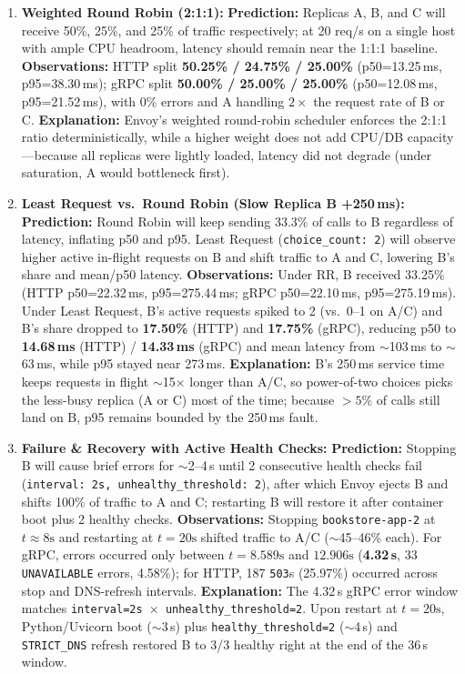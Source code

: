 \documentclass[10pt,a4paper]{article}
\begin{document}
\begin{enumerate}
    \item \textbf{Weighted Round Robin (2:1:1):}
    \textbf{Prediction:} Replicas A, B, and C will receive 50\%, 25\%, and 25\% of traffic respectively; at 20 req/s on a single host with ample CPU headroom, latency should remain near the 1:1:1 baseline.
    \textbf{Observations:} HTTP split \textbf{50.25\% / 24.75\% / 25.00\%} (p50=13.25\,ms, p95=38.30\,ms); gRPC split \textbf{50.00\% / 25.00\% / 25.00\%} (p50=12.08\,ms, p95=21.52\,ms), with 0\% errors and A handling $2\times$ the request rate of B or C.
    \textbf{Explanation:} Envoy's weighted round-robin scheduler enforces the 2:1:1 ratio deterministically, while a higher weight does not add CPU/DB capacity---because all replicas were lightly loaded, latency did not degrade (under saturation, A would bottleneck first).

    \item \textbf{Least Request vs.\ Round Robin (Slow Replica B +250\,ms):}
    \textbf{Prediction:} Round Robin will keep sending 33.3\% of calls to B regardless of latency, inflating p50 and p95. Least Request (\texttt{choice\_count: 2}) will observe higher active in-flight requests on B and shift traffic to A and C, lowering B's share and mean/p50 latency.
    \textbf{Observations:} Under RR, B received 33.25\% (HTTP p50=22.32\,ms, p95=275.44\,ms; gRPC p50=22.10\,ms, p95=275.19\,ms). Under Least Request, B's active requests spiked to 2 (vs.\ 0--1 on A/C) and B's share dropped to \textbf{17.50\%} (HTTP) and \textbf{17.75\%} (gRPC), reducing p50 to \textbf{14.68\,ms} (HTTP) / \textbf{14.33\,ms} (gRPC) and mean latency from $\sim$103\,ms to $\sim$63\,ms, while p95 stayed near 273\,ms.
    \textbf{Explanation:} B's 250\,ms service time keeps requests in flight $\sim$15$\times$ longer than A/C, so power-of-two choices picks the less-busy replica (A or C) most of the time; because $>5\%$ of calls still land on B, p95 remains bounded by the 250\,ms fault.

    \item \textbf{Failure \& Recovery with Active Health Checks:}
    \textbf{Prediction:} Stopping B will cause brief errors for $\sim$2--4\,s until 2 consecutive health checks fail (\texttt{interval: 2s, unhealthy\_threshold: 2}), after which Envoy ejects B and shifts 100\% of traffic to A and C; restarting B will restore it after container boot plus 2 healthy checks.
    \textbf{Observations:} Stopping \texttt{bookstore-app-2} at $t\approx 8\text{s}$ and restarting at $t=20\text{s}$ shifted traffic to A/C ($\sim$45--46\% each). For gRPC, errors occurred only between $t=8.589\text{s}$ and $12.906\text{s}$ (\textbf{4.32\,s}, 33 \texttt{UNAVAILABLE} errors, 4.58\%); for HTTP, 187 \texttt{503}s (25.97\%) occurred across stop and DNS-refresh intervals.
    \textbf{Explanation:} The 4.32\,s gRPC error window matches \texttt{interval=2s $\times$ unhealthy\_threshold=2}. Upon restart at $t=20\text{s}$, Python/Uvicorn boot ($\sim$3\,s) plus \texttt{healthy\_threshold=2} ($\sim$4\,s) and \texttt{STRICT\_DNS} refresh restored B to 3/3 healthy right at the end of the 36\,s window.
\end{enumerate}
\end{document}
